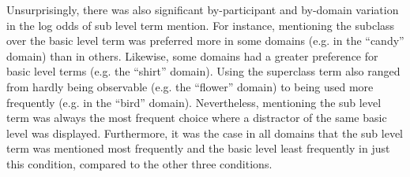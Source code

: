 \documentclass[10pt,letterpaper]{article}
\newcommand{\figref}[1]{Fig.~\ref{#1}}
\begin{document}


%


Unsurprisingly, there was also significant by-participant and by-domain variation in the log odds of sub level term mention. %
For instance, mentioning the subclass over the basic level term was preferred more in some domains (e.g. in the ``candy'' domain) than in others. Likewise, some domains had a greater preference for basic level terms (e.g. the ``shirt'' domain). Using the superclass term also ranged from hardly being observable (e.g. the ``flower'' domain) to being used more frequently (e.g. in the ``bird'' domain). Nevertheless, mentioning the sub level term was always the most frequent choice where a distractor of the same basic level was displayed. Furthermore, it was the case in all domains that the sub level term was mentioned most frequently and the basic level least frequently in just this condition, compared to the other three conditions.


\end{document}
